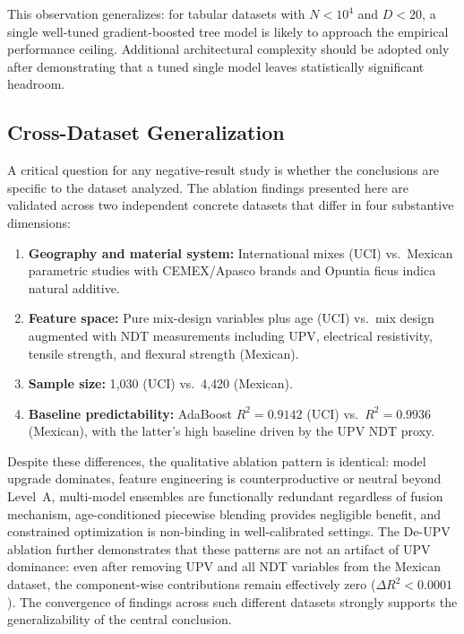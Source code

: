 \documentclass[journal]{IEEEtran}
\begin{document}
This observation generalizes: for tabular datasets with $N < 10^4$ and $D < 20$, a single well-tuned gradient-boosted tree model is likely to approach the empirical performance ceiling. Additional architectural complexity should be adopted only after demonstrating that a tuned single model leaves statistically significant headroom.

\subsection{Cross-Dataset Generalization}

A critical question for any negative-result study is whether the conclusions are specific to the dataset analyzed. The ablation findings presented here are validated across two independent concrete datasets that differ in four substantive dimensions:

\begin{enumerate}
\item \textbf{Geography and material system:} International mixes (UCI) vs.\ Mexican parametric studies with CEMEX/Apasco brands and Opuntia ficus indica natural additive.
\item \textbf{Feature space:} Pure mix-design variables plus age (UCI) vs.\ mix design augmented with NDT measurements including UPV, electrical resistivity, tensile strength, and flexural strength (Mexican).
\item \textbf{Sample size:} 1{,}030 (UCI) vs.\ 4{,}420 (Mexican).
\item \textbf{Baseline predictability:} AdaBoost $R^2 = 0.9142$ (UCI) vs.\ $R^2 = 0.9936$ (Mexican), with the latter's high baseline driven by the UPV NDT proxy.
\end{enumerate}

Despite these differences, the qualitative ablation pattern is identical: model upgrade dominates, feature engineering is counterproductive or neutral beyond Level~A, multi-model ensembles are functionally redundant regardless of fusion mechanism, age-conditioned piecewise blending provides negligible benefit, and constrained optimization is non-binding in well-calibrated settings. The De-UPV ablation further demonstrates that these patterns are not an artifact of UPV dominance: even after removing UPV and all NDT variables from the Mexican dataset, the component-wise contributions remain effectively zero ($\Delta R^2 < 0.0001$). The convergence of findings across such different datasets strongly supports the generalizability of the central conclusion.
\end{document}

